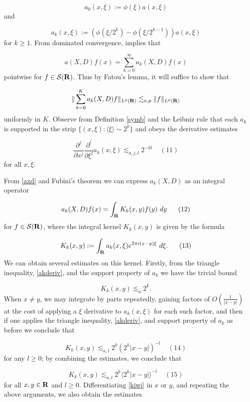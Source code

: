 \documentclass[11pt]{article}
\theoremstyle{definition}
\theoremstyle{remark}
\begin{document}
\[\displaystyle  a_0(x,\xi) := \phi(\xi) a(x,\xi) \]
 and 

\[\displaystyle  a_k(x,\xi) := (\phi(\xi/2^k) - \phi(\xi/2^{k-1})) a(x,\xi)\]
 for \({k \geq 1}\). From dominated convergence, implies that 

\[\displaystyle  a(X,D) f(x) = \sum_{k=0}^\infty a_k(X,D) f(x)\]
 pointwise for \({f \in {\mathcal S}({\bf R})}\). Thus by Fatou’s lemma, it will suffice to show that 

\[\displaystyle  \| \sum_{k=0}^K a_k(X,D) f \|_{L^p({\bf R})} \lesssim_{a,p} \|f\|_{L^p({\bf R})}\]
 uniformly in \({K}\). Observe from Definition \ref{symb} and the Leibniz rule that each \({a_k}\) is supported in the strip \({\{ (x,\xi): \langle \xi \rangle \sim 2^k \}}\) and obeys the derivative estimates \label{akderiv}

\[\displaystyle  \frac{\partial^j}{\partial x^j} \frac{\partial^l}{\partial \xi^l} a_k(x,\xi) \lesssim_{a,j,l} 2^{-kl} \ \ \ \ \ (11)\]
 for all \({x,\xi}\).


From \eqref{axd} and Fubini’s theorem we can express \({a_k(X,D)}\) as an integral operator \label{akxd}

\[\displaystyle  a_k(X,D) f(x) = \int_{\bf R} K_k(x,y) f(y)\ dy \ \ \ \ \ (12)\]
 for \({f \in \mathcal{S}({\bf R})}\), where the integral kernel \({K_k(x,y)}\) is given by the formula \label{kiwi}

\[\displaystyle  K_k(x,y) := \int_{\bf R} a_k(x,\xi) e^{2\pi i (x-y) \xi}\ d\xi. \ \ \ \ \ (13)\]
 We can obtain several estimates on this kernel. Firstly, from the triangle inequality, \eqref{akderiv}, and the support property of \({a_k}\) we have the trivial bound 

\[\displaystyle  K_k(x,y) \lesssim_a 2^k.\]
 When \({x \neq y}\), we may integrate by parts repeatedly, gaining factors of \({O(\frac{1}{|x-y|})}\) at the cost of applying a \({\xi}\) derivative to \({a_k(x,\xi)}\) for each such factor, and then if one applies the triangle inequality, \eqref{akderiv}, and support property of \({a_k}\) as before we conclude that \label{k1}

\[\displaystyle  K_k(x,y) \lesssim_{a,l} 2^k (2^k |x-y|)^{-l} \ \ \ \ \ (14)\]
 for any \({l \geq 0}\); by combining the estimates, we conclude that \label{k2}

\[\displaystyle  K_k(x,y) \lesssim_{a,l} 2^k \langle 2^k |x-y|\rangle^{-l} \ \ \ \ \ (15)\]
 for all \({x,y \in {\bf R}}\) and \({l \geq 0}\). Differentiating \eqref{kiwi} in \({x}\) or \({y}\), and repeating the above arguments, we also obtain the estimates \label{k3}
\end{document}
